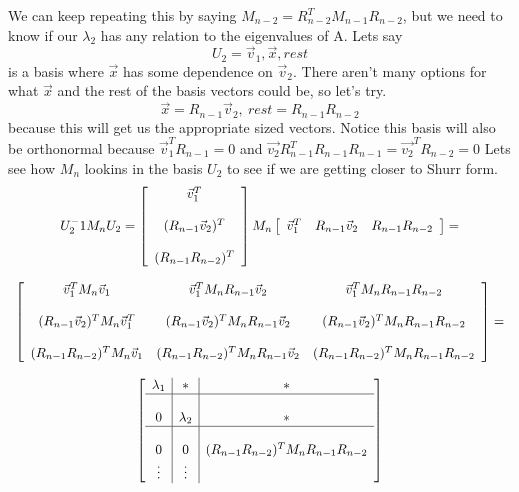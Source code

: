 \documentclass{article}
\begin{document}
We can keep repeating this by saying $M_{n-2} = R_{n-2}^T M_{n-1} R_{n-2}$, but we need to know if our $\lambda_2$ has any relation to the eigenvalues of A.
Lets say $$U_2 = \vec{v}_1, \vec{x}, rest$$ is a basis where $\vec{x}$ has some dependence on $\vec{v}_2$.
There aren't many options for what $\vec{x}$ and the rest of the basis vectors could be, so let's try.
$$\vec{x}=R_{n-1}\vec{v}_2,\ rest = R_{n-1}R_{n-2}$$ because this will get us the appropriate sized vectors.
Notice this basis will also be orthonormal because $\vec{v}_1^T R_{n-1}=0$ and $\vec{v_2}R_{n-1}^TR_{n-1}R_{n-1}=\vec{v_2}^TR_{n-2}=0$
Lets see how $M_n$ lookins in the basis $U_2$ to see if we are getting closer to Shurr form.
\[
    \begin{array}{c}
        U_2^-1M_nU_2 = 
        \left[
            \begin{array}{c}
                \vec{v}_1^T \\\\
                (R_{n-1}\vec{v}_2)^T\\\\
                (R_{n-1}R_{n-2})^T
            \end{array}
        \right]
        M_n
        \left[
            \begin{array}{ccc}
                \vec{v}_1^T & R_{n-1}\vec{v}_2 & R_{n-1}R_{n-2}
            \end{array}
        \right] = \\\\
        \left[
            \begin{array}{ccc}
                \vec{v}_1^T M_n \vec{v}_1 & \vec{v}_1^T M_n R_{n-1}\vec{v}_2 & \vec{v}_1^T M_n R_{n-1}R_{n-2}\\\\
                (R_{n-1}\vec{v}_2)^T M_n \vec{v}_1^T & (R_{n-1}\vec{v}_2)^T M_n R_{n-1}\vec{v}_2 & (R_{n-1}\vec{v}_2)^T M_n R_{n-1}R_{n-2}\\\\
                (R_{n-1}R_{n-2})^T M_n \vec{v}_1 & (R_{n-1}R_{n-2})^T M_n R_{n-1}\vec{v}_2 & (R_{n-1}R_{n-2})^T M_n R_{n-1}R_{n-2}
            \end{array}
        \right] = \\\\
        \left[
            \begin{array}{c|c|c}
                \lambda_1 & *  & *\\
                \hline & &\\
                0 & \lambda_2 & *\\
                \hline & &\\
                0 & 0 & (R_{n-1}R_{n-2})^T M_n R_{n-1}R_{n-2}\\
                \vdots & \vdots
            \end{array}
        \right]
    \end{array}
\]
\end{document}
